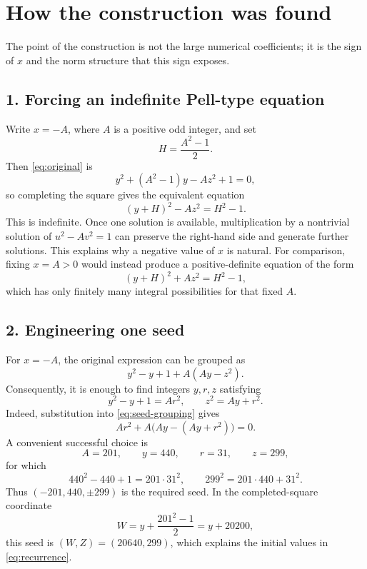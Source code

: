 \documentclass[11pt]{article}
\theoremstyle{remark}
\begin{document}
\section{How the construction was found}

The point of the construction is not the large numerical coefficients; it is the sign of $x$ and the norm structure that this sign exposes.

\subsection*{1. Forcing an indefinite Pell-type equation}
Write $x=-A$, where $A$ is a positive odd integer, and set
\[
 H=\frac{A^2-1}{2}.
\]
Then \eqref{eq:original} is
\[
 y^2+(A^2-1)y-Az^2+1=0,
\]
so completing the square gives the equivalent equation
\begin{equation}\label{eq:general-pell}
 (y+H)^2-Az^2=H^2-1.
\end{equation}
This is indefinite.  Once one solution is available, multiplication by a nontrivial solution of $u^2-Av^2=1$ can preserve the right-hand side and generate further solutions.  This explains why a negative value of $x$ is natural.  For comparison, fixing $x=A>0$ would instead produce a positive-definite equation of the form
\[
 (y+H)^2+Az^2=H^2-1,
\]
which has only finitely many integral possibilities for that fixed $A$.

\subsection*{2. Engineering one seed}
For $x=-A$, the original expression can be grouped as
\begin{equation}\label{eq:seed-grouping}
 y^2-y+1+A(Ay-z^2).
\end{equation}
Consequently, it is enough to find integers $y,r,z$ satisfying
\begin{equation}\label{eq:seed-system}
 y^2-y+1=Ar^2,
 \qquad
 z^2=Ay+r^2.
\end{equation}
Indeed, substitution into \eqref{eq:seed-grouping} gives
\[
 Ar^2+A\bigl(Ay-(Ay+r^2)\bigr)=0.
\]
A convenient successful choice is
\[
 A=201,
 \qquad y=440,
 \qquad r=31,
 \qquad z=299,
\]
for which
\begin{equation}\label{eq:seed-verification}
 440^2-440+1=201\cdot31^2,
 \qquad
 299^2=201\cdot440+31^2.
\end{equation}
Thus $(-201,440,\pm299)$ is the required seed.  In the completed-square coordinate
\[
 W=y+\frac{201^2-1}{2}=y+20200,
\]
this seed is $(W,Z)=(20640,299)$, which explains the initial values in \eqref{eq:recurrence}.
\end{document}
